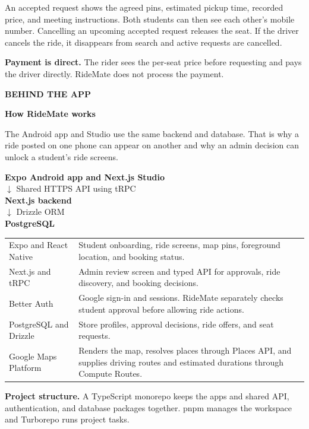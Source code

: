 \documentclass[11pt,a4paper]{article}
\newcommand{\kicker}[1]{{\small\bfseries\textcolor{Pine}{\MakeUppercase{#1}}}\par}
\newcommand{\pageheading}[2]{%
  \pdfbookmark[0]{#2}{guide-page-\thepage}%
  \kicker{#1}%
  {\fontsize{31}{35}\selectfont\bfseries\textcolor{Ink}{#2}\par}%
  \vspace{2pt}%
}
\newcommand{\subhead}[1]{\par\addvspace{8pt}{\large\bfseries\textcolor{Pine}{#1}}\par\nopagebreak[4]}
\newcommand{\panel}[1]{%
  \par\noindent\colorbox{Wash}{\parbox{\dimexpr\linewidth-2\fboxsep\relax}{\setlength{\parskip}{4pt}#1}}\par
}
\begin{document}
An accepted request shows the agreed pins, estimated pickup time, recorded price, and meeting instructions. Both students can then see each other's mobile number. Cancelling an upcoming accepted request releases the seat. If the driver cancels the ride, it disappears from search and active requests are cancelled.

\textbf{Payment is direct.} The rider sees the per-seat price before requesting and pays the driver directly. RideMate does not process the payment.

\newpage
\pageheading{Behind the app}{How RideMate works}

The Android app and Studio use the same backend and database. That is why a ride posted on one phone can appear on another and why an admin decision can unlock a student's ride screens.

\panel{\centering
  \textbf{Expo Android app and Next.js Studio}\\[3pt]
  \(\downarrow\) \enspace Shared HTTPS API using tRPC\\[3pt]
  \textbf{Next.js backend}\\[3pt]
  \(\downarrow\) \enspace Drizzle ORM\\[3pt]
  \textbf{PostgreSQL}}

\subhead{Technology and responsibilities}
\begin{tabularx}{\linewidth}{@{}L{46mm}@{\hspace{5mm}}Y@{}}
\toprule
Expo and React Native & Student onboarding, ride screens, map pins, foreground location, and booking status. \\
Next.js and tRPC & Admin review screen and typed API for approvals, ride discovery, and booking decisions. \\
Better Auth & Google sign-in and sessions. RideMate separately checks student approval before allowing ride actions. \\
PostgreSQL and Drizzle & Store profiles, approval decisions, ride offers, and seat requests. \\
Google Maps Platform & Renders the map, resolves places through Places API, and supplies driving routes and estimated durations through Compute Routes. \\
\bottomrule
\end{tabularx}

\textbf{Project structure.} A TypeScript monorepo keeps the apps and shared API, authentication, and database packages together. pnpm manages the workspace and Turborepo runs project tasks.
\end{document}
